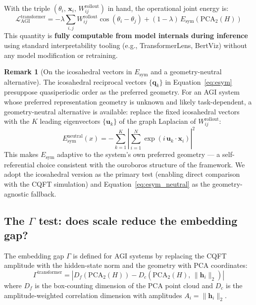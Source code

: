 \documentclass[12pt,a4paper]{article}
\theoremstyle{plain}
\theoremstyle{definition}
\newtheorem{remark}[theorem]{Remark}
\begin{document}
With the triple $(\theta_i,\, \mathbf{x}_i,\, W_{ij}^{\text{rollout}})$
in hand, the operational joint energy is:
\begin{equation}
\label{eq:lagrangian_transformer}
\mathcal{L}_{\text{AGI}}^{\text{transformer}}
  = -\lambda \sum_{i,j} W_{ij}^{\text{rollout}}
    \cos\!\left(\theta_i - \theta_j\right)
  + (1-\lambda)\, E_{\text{sym}}\!\left(\text{PCA}_2(H)\right)
\end{equation}
This quantity is \textbf{fully computable from model internals during
inference} using standard interpretability tooling (e.g.,
TransformerLens, BertViz) without any model modification or retraining.

\begin{remark}[On the icosahedral vectors in $E_{\text{sym}}$ and a
               geometry-neutral alternative]
\label{rem:esym_neutral}
The icosahedral reciprocal vectors $\{\mathbf{q}_k\}$ in
Equation~\eqref{eq:esym} presuppose quasiperiodic order as the preferred
geometry. For an AGI system whose preferred representation geometry is
unknown and likely task-dependent, a geometry-neutral alternative is
available: replace the fixed icosahedral vectors with the $K$ leading
eigenvectors $\{\mathbf{u}_k\}$ of the graph Laplacian of
$W_{ij}^{\text{rollout}}$:
\begin{equation}
\label{eq:esym_neutral}
E_{\text{sym}}^{\text{neutral}}(x)
  = -\sum_{k=1}^{K}\left|
      \sum_{i=1}^{N} \exp\!\left(i\,\mathbf{u}_k \cdot \mathbf{x}_i\right)
    \right|^2
\end{equation}
This makes $E_{\text{sym}}$ adaptive to the system's own preferred
geometry --- a self-referential choice consistent with the ouroboros
structure of the framework. We adopt the icosahedral version as the
primary test (enabling direct comparison with the CQFT simulation) and
Equation~\eqref{eq:esym_neutral} as the geometry-agnostic fallback.
\end{remark}

\subsection{The $\Gamma$ test: does scale reduce the embedding gap?}
\label{subsec:gamma_agi}

The embedding gap $\Gamma$ is defined for AGI systems by replacing the
CQFT amplitude with the hidden-state norm and the geometry with PCA
coordinates:
\begin{equation}
\label{eq:gamma_agi}
\Gamma^{\text{transformer}} = \left|
  D_f\!\left(\text{PCA}_2(H)\right)
  - D_c\!\left(\text{PCA}_2(H),\, \|\mathbf{h}_i\|_2\right)
\right|
\end{equation}
where $D_f$ is the box-counting dimension of the PCA point cloud and
$D_c$ is the amplitude-weighted correlation dimension with amplitudes
$A_i = \|\mathbf{h}_i\|_2$.
\end{document}
